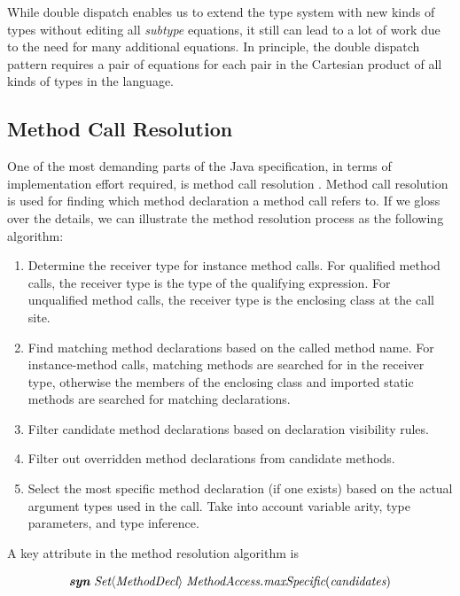 \documentclass[10pt, twoside, openright]{book}
\begin{document}
While double dispatch enables us to extend the type system with
new kinds of types without
editing all \emph{subtype} equations, it still can lead to a lot of work
due to the need for many additional equations.
In principle, the double dispatch pattern requires a pair of equations
for each pair in the Cartesian product of all kinds of types in the language.



\subsection{Method Call Resolution}

One of the most demanding parts of the Java specification, in terms of implementation effort required,
is method call resolution \cite[\S 15.12.2]{jls7}.
Method call resolution is used for finding which method
declaration a method call refers to. If we gloss over the details, we can illustrate the
method resolution process as the following algorithm:

\begin{enumerate}
  \item Determine the receiver type for instance method calls.
    For qualified method calls, the receiver type is
    the type of the qualifying expression. For unqualified method calls, the receiver
    type is the enclosing class at the call site.
  \item Find matching method declarations based on the called method name.
    For instance-method calls, matching methods are searched for in the receiver type,
    otherwise the members of the enclosing class and imported static
    methods are searched for matching declarations.
  \item Filter candidate method declarations based on declaration visibility rules.
  \item Filter out overridden method declarations from candidate methods.
  \item Select the most specific method declaration (if one exists) based on the actual argument
    types used in the call.  Take into account variable arity, type parameters, and type inference.
\end{enumerate}

\noindent
A key attribute in the method resolution algorithm is

\begin{equation*}
\textbf{\textit{syn}} \; \textit{Set}\langle\textit{MethodDecl}\rangle \; \textit{MethodAccess.maxSpecific}(\textit{candidates})
\end{equation*}
\end{document}
